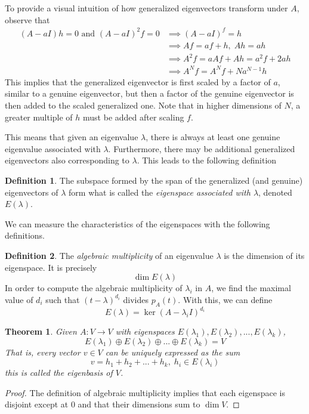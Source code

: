 \documentclass{article}
\newtheorem{theorem}{Theorem}[section]
\theoremstyle{remark}
\theoremstyle{definition}
\newtheorem{definition}{Definition}[section]
\begin{document}
To provide a visual intuition of how generalized eigenvectors transform under $A$, observe that 
\begin{align}
    (A - aI) h = 0 \text{ and } (A - aI)^2 f = 0 & \implies (A - aI)^f = h \\
    & \implies A f = a f + h, \; Ah = ah \\
    & \implies A^2 f = a A f + A h = a^2 f + 2 a h \\
    & \implies A^N f = A^N f + N a^{N-1} h 
\end{align}
This implies that the generalized eigenvector is first scaled by a factor of $a$, similar to a genuine eigenvector, but then a factor of the genuine eigenvector is then added to the scaled generalized one. Note that in higher dimensions of $N$, a greater multiple of $h$ must be added after scaling $f$. 

This means that given an eigenvalue $\lambda$, there is always at least one genuine eigenvalue associated with $\lambda$. Furthermore, there may be additional generalized eigenvectors also corresponding to $\lambda$. This leads to the following definition

\begin{definition}
The subspace formed by the span of the generalized (and genuine) eigenvectors of $\lambda$ form what is called the \textit{eigenspace associated with $\lambda$}, denoted $E(\lambda)$. 
\end{definition}

We can measure the characteristics of the eigenspaces with the following definitions. 

\begin{definition}
The \textit{algebraic multiplicity} of an eigenvalue $\lambda$ is the dimension of its eigenspace. It is precisely
\[\dim{E(\lambda)}\]  
In order to compute the algebraic multiplicity of $\lambda_i$ in $A$, we find the maximal value of $d_i$ such that $(t-\lambda)^{d_i}$ divides $p_A (t)$. With this, we can define 
\[E(\lambda) = \ker{(A - \lambda_i I)^{d_i}}\]
\end{definition} 

\begin{theorem}
Given $A: V \longrightarrow V$ with eigenspaces $E(\lambda_1), E(\lambda_2), ..., E(\lambda_k)$, 
\[E(\lambda_1) \oplus E(\lambda_2) \oplus ... \oplus E(\lambda_k) = V\]
That is, every vector $v \in V$ can be uniquely expressed as the sum 
\[ v = h_1 + h_2 + ... + h_k, \; h_i \in E(\lambda_i)\]
this is called the \textit{eigenbasis of $V$}. 
\end{theorem}
\begin{proof}
The definition of algebraic multiplicity implies that each eigenspace is disjoint except at $0$ and that their dimensions sum to $\dim{V}$. 
\end{proof}
\end{document}
